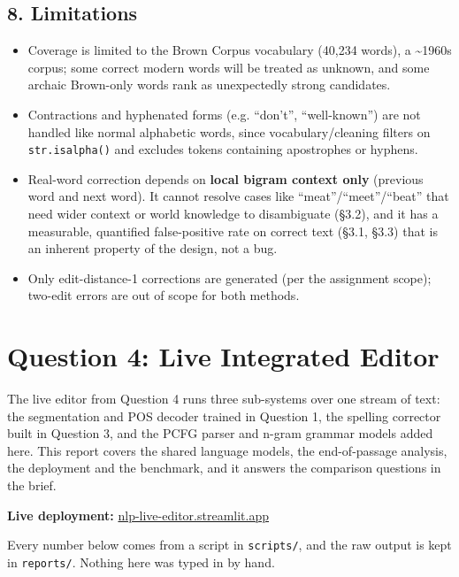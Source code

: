 \documentclass[11pt,a4paper]{article}
\begin{document}
\subsection*{8. Limitations}

\begin{itemize}
\item Coverage is limited to the Brown Corpus vocabulary (40,234 words), a \textasciitilde{}1960s corpus; some correct modern words will be treated as unknown, and some archaic Brown-only words rank as unexpectedly strong candidates.
\item Contractions and hyphenated forms (e.g. ``don't'', ``well-known'') are not handled like normal alphabetic words, since vocabulary/cleaning filters on \texttt{str.\allowbreak{}isalpha()} and excludes tokens containing apostrophes or hyphens.
\item Real-word correction depends on \textbf{local bigram context only} (previous word and next word). It cannot resolve cases like ``meat''/``meet''/``beat'' that need wider context or world knowledge to disambiguate (\S{}3.2), and it has a measurable, quantified false-positive rate on correct text (\S{}3.1, \S{}3.3) that is an inherent property of the design, not a bug.
\item Only edit-distance-1 corrections are generated (per the assignment scope); two-edit errors are out of scope for both methods.
\end{itemize}

\clearpage
\section*{Question 4: Live Integrated Editor}

The live editor from Question 4 runs three sub-systems over one stream of text: the segmentation and POS decoder trained in Question 1, the spelling corrector built in Question 3, and the PCFG parser and n-gram grammar models added here. This report covers the shared language models, the end-of-passage analysis, the deployment and the benchmark, and it answers the comparison questions in the brief.

\textbf{Live deployment:} \href{https://nlp-live-editor.streamlit.app/}{nlp-live-editor.streamlit.app}

Every number below comes from a script in \texttt{scripts/\allowbreak{}}, and the raw output is kept in \texttt{reports/\allowbreak{}}. Nothing here was typed in by hand.
\end{document}
